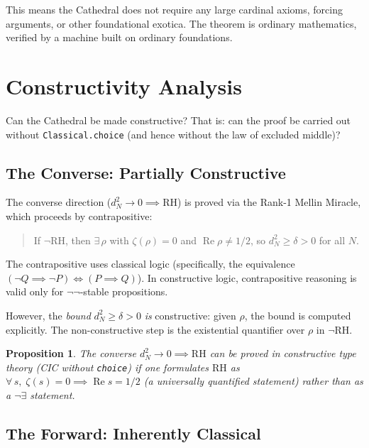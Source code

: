 \documentclass[11pt,a4paper]{article}
\theoremstyle{plain}
\newtheorem{proposition}[theorem]{Proposition}
\theoremstyle{definition}
\newcommand{\lean}[1]{\texttt{#1}}
\newcommand{\RH}{\ensuremath{\mathrm{RH}}}
\newcommand{\re}{\operatorname{Re}}
\begin{document}
This means the Cathedral does not require any large cardinal axioms,
forcing arguments, or other foundational exotica. The theorem is
ordinary mathematics, verified by a machine built on ordinary
foundations.

\section{Constructivity Analysis}
\label{sec:constructive}

Can the Cathedral be made constructive? That is: can the proof be
carried out without \lean{Classical.choice} (and hence without the
law of excluded middle)?

\subsection{The Converse: Partially Constructive}

The converse direction ($d_N^2 \to 0 \implies \RH$) is proved via
the Rank-1 Mellin Miracle, which proceeds by contrapositive:

\begin{quote}
If $\neg\RH$, then $\exists\,\rho$ with $\zeta(\rho) = 0$ and
$\re\rho \neq 1/2$, so $d_N^2 \geq \delta > 0$ for all $N$.
\end{quote}

The contrapositive uses classical logic (specifically, the
equivalence $(\neg Q \implies \neg P) \iff (P \implies Q)$). In
constructive logic, contrapositive reasoning is valid only for
$\neg\neg$-stable propositions.

However, the \emph{bound} $d_N^2 \geq \delta > 0$ \emph{is}
constructive: given $\rho$, the bound is computed explicitly. The
non-constructive step is the existential quantifier over $\rho$ in
$\neg\RH$.

\begin{proposition}
The converse $d_N^2 \to 0 \implies \RH$ can be proved in
constructive type theory (CIC without \lean{choice}) if one
formulates $\RH$ as $\forall\,s,\;\zeta(s) = 0 \implies
\re s = 1/2$ (a universally quantified statement) rather than
as a $\neg\exists$ statement.
\end{proposition}

\subsection{The Forward: Inherently Classical}
\end{document}

